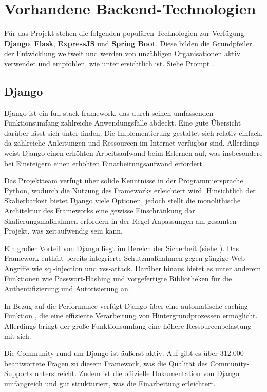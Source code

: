 \section{Vorhandene Backend-Technologien}

Für das Projekt stehen die folgenden populären Technologien zur Verfügung: \textbf{Django}, \textbf{Flask}, \textbf{ExpressJS} und \textbf{Spring Boot}. Diese bilden die Grundpfeiler der Entwicklung weltweit und werden von unzähligen Organisationen aktiv verwendet und empfohlen, wie unter \cite{website-popular-backend-framework} ersichtlich ist. Siehe Prompt \cite{prompt-gpt-list-to-text-individual}.

\subsection{Django}
Django ist ein \gls{full-stack-framework}, das durch seinen umfassenden Funktionsumfang zahlreiche Anwendungsfälle abdeckt. Eine gute Übersicht darüber lässt sich unter \cite{website-django-functionality-summary} finden. Die Implementierung gestaltet sich relativ einfach, da zahlreiche Anleitungen und Ressourcen im Internet verfügbar sind. Allerdings weist Django einen erhöhten Arbeitsaufwand beim Erlernen auf, was insbesondere bei Einsteigern einen erhöhten Einarbeitungsaufwand erfordert.

Das Projektteam verfügt über solide Kenntnisse in der Programmiersprache Python, wodurch die Nutzung des Frameworks erleichtert wird. Hinsichtlich der Skalierbarkeit bietet Django viele Optionen, jedoch stellt die monolithische Architektur des Frameworks eine gewisse Einschränkung dar. Skalierungsmaßnahmen erfordern in der Regel Anpassungen am gesamten Projekt, was zeitaufwendig sein kann.

Ein großer Vorteil von Django liegt im Bereich der Sicherheit (siehe \cite{website-django-security-summary}). Das Framework enthält bereits integrierte Schutzmaßnahmen gegen gängige Web-Angriffe wie \gls{sql-injection} und \gls{xss-attack}. Darüber hinaus bietet es unter anderem Funktionen wie Passwort-Hashing und vorgefertigte Bibliotheken für die Authentifizierung und Autorisierung an.

In Bezug auf die Performance verfügt Django über eine automatische \gls{caching}-Funktion \cite{website-django-caching}, die eine effiziente Verarbeitung von Hintergrundprozessen ermöglicht. Allerdings bringt der große Funktionsumfang eine höhere Ressourcenbelastung mit sich. 

Die Community rund um Django ist äußerst aktiv. Auf \cite{website-stackoverflow-django} gibt es über 312.000 beantwortete Fragen zu diesem Framework, was die Qualität des Community-Supports unterstreicht. Zudem ist die offizielle Dokumentation von Django umfangreich und gut strukturiert, was die Einarbeitung erleichtert. \cite{website-django-docs}

